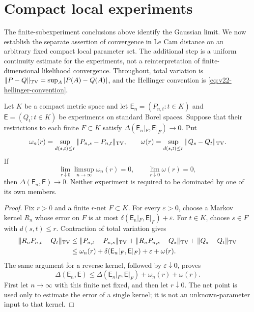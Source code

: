 \section{Compact local experiments}
\label{sec:v32-compact-experiments}

The finite-subexperiment conclusions above identify the Gaussian limit.  We
now establish the separate assertion of convergence in Le Cam distance on an
arbitrary fixed compact local parameter set.  The additional step is a
uniform continuity estimate for the experiments, not a reinterpretation of
finite-dimensional likelihood convergence.  Throughout, total variation is
\(\|P-Q\|_{\rm TV}=\sup_A|P(A)-Q(A)|\), and the Hellinger convention is
\eqref{eq:v22-hellinger-convention}.

\begin{lemma}
\label{lem:v32-finite-net}
Let \(K\) be a compact metric space and let
\(\mathsf E_n=(P_{n,t}:t\in K)\) and
\(\mathsf E=(Q_t:t\in K)\) be experiments on standard Borel spaces.
Suppose that their restrictions to each finite \(F\subset K\) satisfy
\(\Delta(\mathsf E_n|_F,\mathsf E|_F)\to0\).  Put
\[
 \omega_n(r)=\sup_{d(s,t)\le r}\|P_{n,s}-P_{n,t}\|_{\rm TV},
 \qquad
 \omega(r)=\sup_{d(s,t)\le r}\|Q_s-Q_t\|_{\rm TV}.
\]
If
\begin{equation}\label{eq:v32-net-moduli}
 \lim_{r\downarrow0}\limsup_{n\to\infty}\omega_n(r)=0,
 \qquad \lim_{r\downarrow0}\omega(r)=0,
\end{equation}
then \(\Delta(\mathsf E_n,\mathsf E)\to0\).  Neither experiment is required
to be dominated by one of its own members.
\end{lemma}

\begin{proof}
Fix \(r>0\) and a finite \(r\)-net \(F\subset K\).  For every
\(\varepsilon>0\), choose a Markov kernel \(R_n\) whose error on \(F\)
is at most \(\delta(\mathsf E_n|_F,\mathsf E|_F)+\varepsilon\).
For \(t\in K\), choose \(s\in F\) with \(d(s,t)\le r\).  Contraction of
total variation gives
\begin{align*}
 \|R_nP_{n,t}-Q_t\|_{\rm TV}
 &\le \|P_{n,t}-P_{n,s}\|_{\rm TV}
       +\|R_nP_{n,s}-Q_s\|_{\rm TV}+\|Q_s-Q_t\|_{\rm TV}\\
 &\le \omega_n(r)+\delta(\mathsf E_n|_F,\mathsf E|_F)
       +\varepsilon+\omega(r).
\end{align*}
The same argument for a reverse kernel, followed by
\(\varepsilon\downarrow0\), proves
\begin{equation}\label{eq:v32-net-inequality}
 \Delta(\mathsf E_n,\mathsf E)
 \le \Delta(\mathsf E_n|_F,\mathsf E|_F)+\omega_n(r)+\omega(r).
\end{equation}
First let \(n\to\infty\) with this finite net fixed, and then let
\(r\downarrow0\).  The net point is used only to estimate the error of a
single kernel; it is not an unknown-parameter input to that kernel.
\end{proof}


